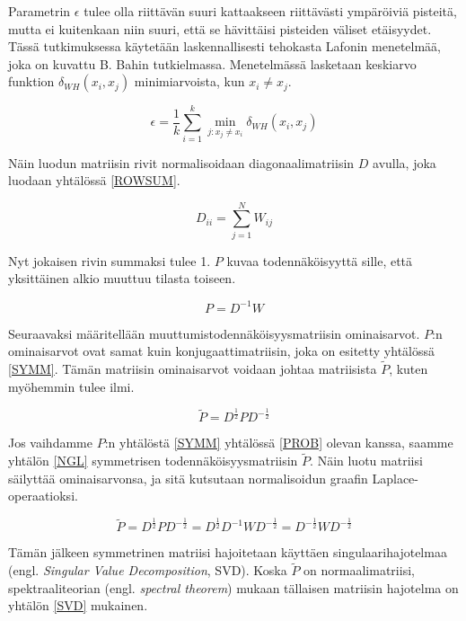 Parametrin $\epsilon$ tulee olla riittävän suuri kattaakseen riittävästi ympäröiviä pisteitä, mutta ei kuitenkaan niin suuri, että se hävittäisi pisteiden väliset etäisyydet. Tässä tutkimuksessa käytetään laskennallisesti tehokasta Lafonin menetelmää, joka on kuvattu B. Bahin tutkielmassa\cite[s. 18]{bah}. 
Menetelmässä lasketaan keskiarvo funktion $\delta_{WH}(x_i,x_j)$ minimiarvoista, kun $x_i \ne x_j$. 

\begin{equation*}
\epsilon = \frac{1}{k} \sum_{i=1}^k \min_{j:x_j \ne x_i} \delta_{WH}(x_i, x_j)
\label{EPSILON}
\end{equation*}

\noindent Näin luodun matriisin rivit normalisoidaan diagonaalimatriisin $D$ avulla, joka luodaan yhtälössä \ref{ROWSUM}. 

\begin{equation}
D_{ii} = \sum_{j=1}^{N} W_{ij}
\label{ROWSUM}
\end{equation}

\noindent Nyt jokaisen rivin summaksi tulee 1. $P$ kuvaa todennäköisyyttä sille, että yksittäinen alkio muuttuu tilasta toiseen.

\begin{equation}
P = D^{-1} W
\label{PROB}
\end{equation}

\noindent Seuraavaksi määritellään muuttumistodennäköisyysmatriisin ominaisarvot. $P$:n ominaisarvot ovat samat kuin konjugaattimatriisin, joka on esitetty yhtälössä \ref{SYMM}. Tämän matriisin ominaisarvot voidaan johtaa matriisista $\tilde{P}$, kuten myöhemmin tulee ilmi.

\begin{equation}
\tilde{P} = D^{\frac{1}{2}} P D^{-\frac{1}{2}}
\label{SYMM}
\end{equation}

\noindent Jos vaihdamme $P$:n yhtälöstä \ref{SYMM} yhtälössä \ref{PROB} olevan kanssa, saamme yhtälön \ref{NGL} symmetrisen todennäköisyysmatriisin $\tilde{P}$. Näin luotu matriisi säilyttää ominaisarvonsa, ja sitä kutsutaan normalisoidun graafin Laplace-operaatioksi.

\begin{equation}
\tilde{P} = D^{\frac{1}{2}} P D^{-\frac{1}{2}} = D^{\frac{1}{2}} D^{-1} W D^{-\frac{1}{2}} = D^{-\frac{1}{2}} W D^{-\frac{1}{2}}
\label{NGL}
\end{equation}

\noindent Tämän jälkeen symmetrinen matriisi hajoitetaan käyttäen singulaarihajotelmaa (engl. \textit{Singular Value Decomposition}, SVD). Koska $\tilde{P}$ on normaalimatriisi, spektraaliteorian (engl. \textit{spectral theorem}) mukaan tällaisen matriisin 
hajotelma on yhtälön \ref{SVD} mukainen.  

